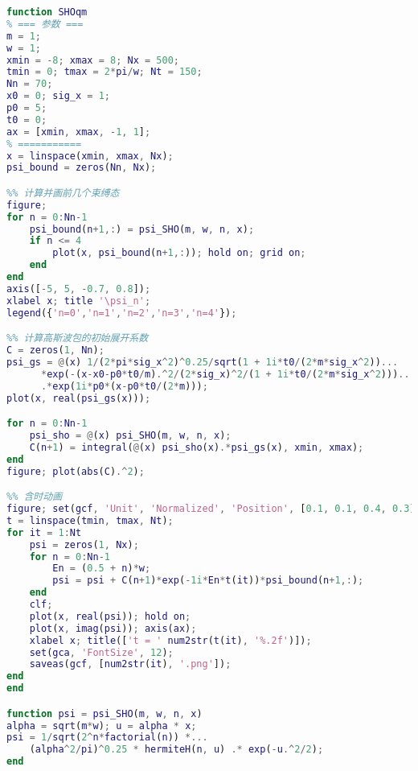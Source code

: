 
\begin{lstlisting}[language=matlab]
% 高斯波包在简谐振子势阱中运动
function SHOqm
% === 参数 ===
m = 1;
w = 1;
xmin = -8; xmax = 8; Nx = 500;
tmin = 0; tmax = 2*pi/w; Nt = 150;
Nn = 70;
x0 = 0; sig_x = 1;
p0 = 5;
t0 = 0;
ax = [xmin, xmax, -1, 1];
% ===========
x = linspace(xmin, xmax, Nx);
psi_bound = zeros(Nn, Nx);

%% 计算并画前几个束缚态
figure;
for n = 0:Nn-1
    psi_bound(n+1,:) = psi_SHO(m, w, n, x);
    if n <= 4
        plot(x, psi_bound(n+1,:)); hold on; grid on;
    end
end
axis([-5, 5, -0.7, 0.8]);
xlabel x; title '\psi_n';
legend({'n=0','n=1','n=2','n=3','n=4'});

%% 计算高斯波包的初始展开系数
C = zeros(1, Nn);
psi_gs = @(x) 1/(2*pi*sig_x^2)^0.25/sqrt(1 + 1i*t0/(2*m*sig_x^2))...
      *exp(-(x-x0-p0*t0/m).^2/(2*sig_x)^2/(1 + 1i*t0/(2*m*sig_x^2)))...
      .*exp(1i*p0*(x-p0*t0/(2*m)));
plot(x, real(psi_gs(x)));

for n = 0:Nn-1
    psi_sho = @(x) psi_SHO(m, w, n, x);
    C(n+1) = integral(@(x) psi_sho(x).*psi_gs(x), xmin, xmax);
end
figure; plot(abs(C).^2);

%% 含时动画
figure; set(gcf, 'Unit', 'Normalized', 'Position', [0.1, 0.1, 0.4, 0.3]);
t = linspace(tmin, tmax, Nt);
for it = 1:Nt
    psi = zeros(1, Nx);
    for n = 0:Nn-1
        En = (0.5 + n)*w;
        psi = psi + C(n+1)*exp(-1i*En*t(it))*psi_bound(n+1,:);
    end
    clf;
    plot(x, real(psi)); hold on;
    plot(x, imag(psi)); axis(ax);
    xlabel x; title(['t = ' num2str(t(it), '%.2f')]);
    set(gca, 'FontSize', 12);
    saveas(gcf, [num2str(it), '.png']);
end
end

function psi = psi_SHO(m, w, n, x)
alpha = sqrt(m*w); u = alpha * x;
psi = 1/sqrt(2^n*factorial(n)) *...
    (alpha^2/pi)^0.25 * hermiteH(n, u) .* exp(-u.^2/2);
end
\end{lstlisting}
